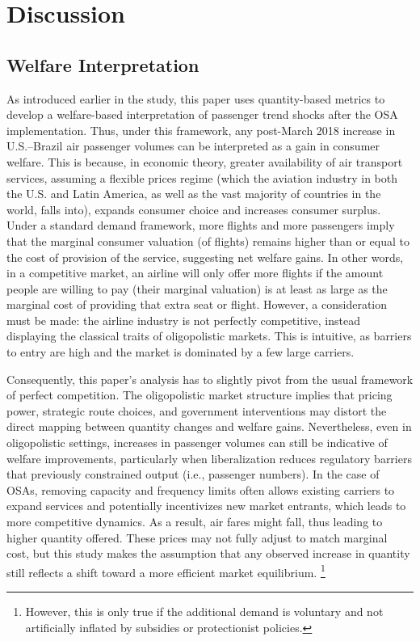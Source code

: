 \documentclass[12pt]{article}
\begin{document}
\section{Discussion}
\subsection{Welfare Interpretation}
As introduced earlier in the study, this paper uses quantity-based metrics to develop a welfare-based interpretation of passenger trend shocks after the OSA implementation. Thus, under this framework, any post-March 2018 increase in U.S.–Brazil air passenger volumes can be interpreted as a gain in consumer welfare. This is because, in economic theory, greater availability of air transport services, assuming a flexible prices regime (which the aviation industry in both the U.S. and Latin America, as well as the vast majority of countries in the world, falls into), expands consumer choice and increases consumer surplus. Under a standard demand framework, more flights and more passengers imply that the marginal consumer valuation (of flights) remains higher than or equal to the cost of provision of the service, suggesting net welfare gains. In other words, in a competitive market, an airline will only offer more flights if the amount people are willing to pay (their marginal valuation) is at least as large as the marginal cost of providing that extra seat or flight. However, a consideration must be made: the airline industry is not perfectly competitive, instead displaying the classical traits of oligopolistic markets. This is intuitive, as barriers to entry are high and the market is dominated by a few large carriers. 

Consequently, this paper’s analysis has to slightly pivot from the usual framework of perfect competition. The oligopolistic market structure implies that pricing power, strategic route choices, and government interventions may distort the direct mapping between quantity changes and welfare gains. Nevertheless, even in oligopolistic settings, increases in passenger volumes can still be indicative of welfare improvements, particularly when liberalization reduces regulatory barriers that previously constrained output (i.e., passenger numbers). In the case of OSAs, removing capacity and frequency limits often allows existing carriers to expand services and potentially incentivizes new market entrants, which leads to more competitive dynamics. As a result, air fares might fall, thus leading to higher quantity offered. These prices may not fully adjust to match marginal cost, but this study makes the assumption that any observed increase in quantity still reflects a shift toward a more efficient market equilibrium. \footnote{However, this is only true if the additional demand is voluntary and not artificially inflated by subsidies or protectionist policies.}
\end{document}
